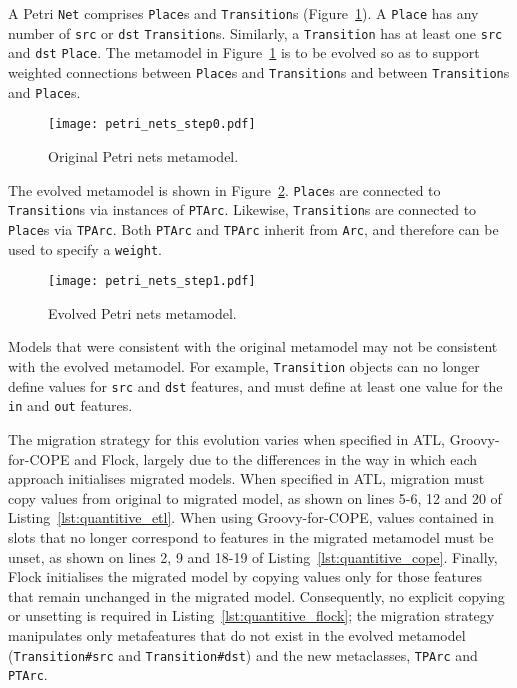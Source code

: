 A Petri \texttt{Net} comprises \texttt{Place}s and \texttt{Transition}s (Figure~\ref{fig:original_mm}). A \texttt{Place} has any number of \texttt{src} or \texttt{dst} \texttt{Transition}s. Similarly, a \texttt{Transition} has at least one \texttt{src} and \texttt{dst} \texttt{Place}. The metamodel in Figure~\ref{fig:original_mm} is to be evolved so as to support weighted connections between \texttt{Place}s and \texttt{Transition}s and between \texttt{Transition}s and \texttt{Place}s.

\begin{figure}[htbp]
  \centering
  \texttt{[image: petri\_nets\_step0.pdf]}
  \caption{Original Petri nets metamodel.}
  \label{fig:original_mm}
\end{figure}

The evolved metamodel is shown in Figure~\ref{fig:evolved_mm}. \texttt{Place}s are connected to \texttt{Transition}s via instances of \texttt{PTArc}. Likewise, \texttt{Transition}s are connected to \texttt{Place}s via \texttt{TPArc}. Both \texttt{PTArc} and \texttt{TPArc} inherit from \texttt{Arc}, and therefore can be used to specify a \texttt{weight}.

\begin{figure}[htbp]
  \centering
  \texttt{[image: petri\_nets\_step1.pdf]}
  \caption{Evolved Petri nets metamodel.}
  \label{fig:evolved_mm}
\end{figure}

Models that were consistent with the original metamodel may not be consistent with the evolved metamodel. For example, \texttt{Transition} objects can no longer define values for \texttt{src} and \texttt{dst} features, and must define at least one value for the \texttt{in} and \texttt{out} features.

The migration strategy for this evolution varies when specified in ATL, Groovy-for-COPE and Flock, largely due to the differences in the way in which each approach initialises migrated models. When specified in ATL, migration must copy values from original to migrated model, as shown on lines 5-6, 12 and 20 of Listing~\ref{lst:quantitive_etl}. When using Groovy-for-COPE, values contained in slots that no longer correspond to features in the migrated metamodel must be unset, as shown on lines 2, 9 and 18-19 of Listing~\ref{lst:quantitive_cope}. Finally, Flock initialises the migrated model by copying values only for those features that remain unchanged in the migrated model. Consequently, no explicit copying or unsetting is required in Listing~\ref{lst:quantitive_flock}; the migration strategy manipulates only metafeatures that do not exist in the evolved metamodel (\texttt{Transition\#src} and \texttt{Transition\#dst}) and the new metaclasses, \texttt{TPArc} and \texttt{PTArc}.

